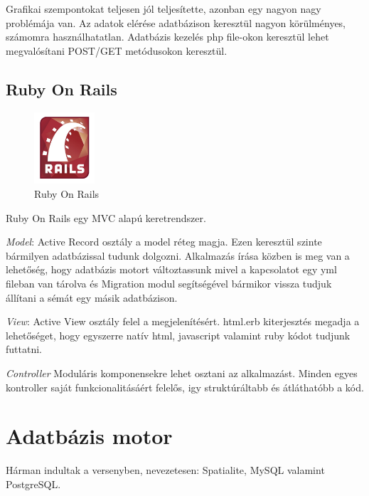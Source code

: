 		Grafikai szempontokat teljesen jól teljesítette, azonban egy nagyon nagy problémája van. Az adatok elérése adatbázison
		keresztül nagyon körülményes, számomra használhatatlan. Adatbázis kezelés php file-okon keresztül lehet megvalósítani POST/GET
		metódusokon keresztül.
		
		\subsection{Ruby On Rails} %
		\label{sub:ruby_on_rails}
		
		\begin{figure}
		  \vspace{-20pt}
		  \begin{center}
		    \includegraphics[width=0.2\textwidth]{chapters/chap5/img/rails.jpg}
		  \end{center}
		  \vspace{-20pt}
		  \caption{Ruby On Rails}
		\end{figure}

		Ruby On Rails egy MVC alapú keretrendszer. 
		
		
		\emph{Model}: Active Record osztály a model réteg magja. Ezen keresztül szinte bármilyen adatbázissal tudunk dolgozni. 
		Alkalmazás írása közben is meg van a lehetőség, hogy adatbázis motort változtassunk mivel a kapcsolatot egy yml fileban van tárolva
		és Migration modul segítségével bármikor vissza tudjuk állítani a sémát egy másik adatbázison.
		
		
		\emph{View}: Active View osztály felel a megjelenítésért. html.erb kiterjesztés megadja a lehetőséget, hogy egyszerre natív html, javascript
		valamint ruby kódot tudjunk futtatni. 
		
		
		\emph{Controller} Moduláris komponensekre lehet osztani az alkalmazást. Minden egyes kontroller saját funkcionalitásáért felelős, igy struktúráltabb
		és átláthatóbb a kód.

	\section{Adatbázis motor}
	Hárman indultak a versenyben, nevezetesen: Spatialite, MySQL valamint PostgreSQL.
	
